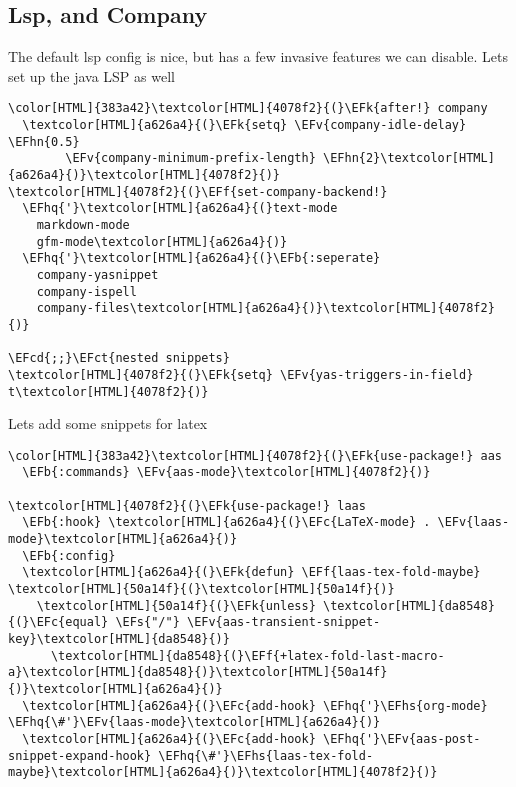 \documentclass{scrartcl}
\newcommand{\EFk}[1]{\textcolor{EFk}{#1}} %
\newcommand{\EFs}[1]{\textcolor{EFs}{#1}} %
\newcommand{\EFb}[1]{\textcolor{EFb}{#1}} %
\newcommand{\EFct}[1]{\textcolor{EFct}{#1}} %
\newcommand{\EFc}[1]{\textcolor{EFc}{#1}} %
\newcommand{\EFv}[1]{\textcolor{EFv}{#1}} %
\newcommand{\EFf}[1]{\textcolor{EFf}{#1}} %
\newcommand{\EFcd}[1]{\textcolor{EFcd}{#1}} %
\newcommand{\EFhn}[1]{\textcolor{EFhn}{\textbf{#1}}} %
\newcommand{\EFhq}[1]{\textcolor{EFhq}{#1}} %
\newcommand{\EFhs}[1]{\textcolor{EFhs}{#1}} %
\begin{document}
\subsection{Lsp, and Company}
\label{sec:org95fd1c5}
The default lsp config is nice, but has a few invasive features we can disable. Lets set up the java LSP as well
\begin{Code}
\begin{Verbatim}[]
\color[HTML]{383a42}\textcolor[HTML]{4078f2}{(}\EFk{after!} company
  \textcolor[HTML]{a626a4}{(}\EFk{setq} \EFv{company-idle-delay} \EFhn{0.5}
        \EFv{company-minimum-prefix-length} \EFhn{2}\textcolor[HTML]{a626a4}{)}\textcolor[HTML]{4078f2}{)}
\textcolor[HTML]{4078f2}{(}\EFf{set-company-backend!}
  \EFhq{'}\textcolor[HTML]{a626a4}{(}text-mode
    markdown-mode
    gfm-mode\textcolor[HTML]{a626a4}{)}
  \EFhq{'}\textcolor[HTML]{a626a4}{(}\EFb{:seperate}
    company-yasnippet
    company-ispell
    company-files\textcolor[HTML]{a626a4}{)}\textcolor[HTML]{4078f2}{)}

\EFcd{;;}\EFct{nested snippets}
\textcolor[HTML]{4078f2}{(}\EFk{setq} \EFv{yas-triggers-in-field} t\textcolor[HTML]{4078f2}{)}
\end{Verbatim}
\end{Code}

Lets add some snippets for latex
\begin{Code}
\begin{Verbatim}[]
\color[HTML]{383a42}\textcolor[HTML]{4078f2}{(}\EFk{use-package!} aas
  \EFb{:commands} \EFv{aas-mode}\textcolor[HTML]{4078f2}{)}

\textcolor[HTML]{4078f2}{(}\EFk{use-package!} laas
  \EFb{:hook} \textcolor[HTML]{a626a4}{(}\EFc{LaTeX-mode} . \EFv{laas-mode}\textcolor[HTML]{a626a4}{)}
  \EFb{:config}
  \textcolor[HTML]{a626a4}{(}\EFk{defun} \EFf{laas-tex-fold-maybe} \textcolor[HTML]{50a14f}{(}\textcolor[HTML]{50a14f}{)}
    \textcolor[HTML]{50a14f}{(}\EFk{unless} \textcolor[HTML]{da8548}{(}\EFc{equal} \EFs{"/"} \EFv{aas-transient-snippet-key}\textcolor[HTML]{da8548}{)}
      \textcolor[HTML]{da8548}{(}\EFf{+latex-fold-last-macro-a}\textcolor[HTML]{da8548}{)}\textcolor[HTML]{50a14f}{)}\textcolor[HTML]{a626a4}{)}
  \textcolor[HTML]{a626a4}{(}\EFc{add-hook} \EFhq{'}\EFhs{org-mode} \EFhq{\#'}\EFv{laas-mode}\textcolor[HTML]{a626a4}{)}
  \textcolor[HTML]{a626a4}{(}\EFc{add-hook} \EFhq{'}\EFv{aas-post-snippet-expand-hook} \EFhq{\#'}\EFhs{laas-tex-fold-maybe}\textcolor[HTML]{a626a4}{)}\textcolor[HTML]{4078f2}{)}

\end{Verbatim}
\end{Code}
\end{document}
